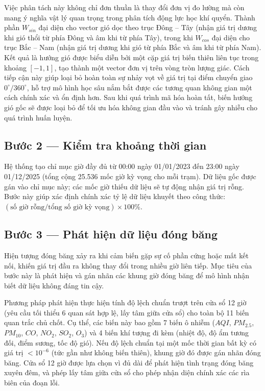 Việc phân tách này không chỉ đơn thuần là thay đổi đơn vị đo lường mà còn mang ý nghĩa vật lý quan trọng trong phân tích động lực học khí quyển. Thành phần $W_{sin}$ đại diện cho vector gió dọc theo trục Đông -- Tây (nhận giá trị dương khi gió thổi từ phía Đông và âm khi từ phía Tây), trong khi $W_{cos}$ đại diện cho trục Bắc -- Nam (nhận giá trị dương khi gió từ phía Bắc và âm khi từ phía Nam). Kết quả là hướng gió được biểu diễn bởi một cặp giá trị biến thiên liên tục trong khoảng $[-1, 1]$, tạo thành một vector đơn vị trên vòng tròn lượng giác. Cách tiếp cận này giúp loại bỏ hoàn toàn sự nhảy vọt về giá trị tại điểm chuyển giao $0^\circ/360^\circ$, hỗ trợ mô hình học sâu nắm bắt được các tương quan không gian một cách chính xác và ổn định hơn. Sau khi quá trình mã hóa hoàn tất, biến hướng gió gốc sẽ được loại bỏ để tối ưu hóa không gian đầu vào và tránh gây nhiễu cho quá trình huấn luyện.\subsection{Bước 2 --- Kiểm tra khoảng thời gian}

Hệ thống tạo chỉ mục giờ đầy đủ từ 00:00 ngày 01/01/2023 đến 23:00 ngày 01/12/2025 (tổng cộng 25.536 mốc giờ kỳ vọng cho mỗi trạm). Dữ liệu gốc được gán vào chỉ mục này; các mốc giờ thiếu dữ liệu sẽ tự động nhận giá trị rỗng. Bước này giúp xác định chính xác tỷ lệ dữ liệu khuyết theo công thức: $(\text{số giờ rỗng} / \text{tổng số giờ kỳ vọng}) \times 100\%$.

\subsection{Bước 3 --- Phát hiện dữ liệu đóng băng}

Hiện tượng đóng băng xảy ra khi cảm biến gặp sự cố phần cứng hoặc mất kết nối, khiến giá trị đầu ra không thay đổi trong nhiều giờ liên tiếp. Mục tiêu của bước này là phát hiện và gán nhãn các khung giờ đóng băng để mô hình nhận biết dữ liệu không đáng tin cậy.

Phương pháp phát hiện thực hiện tính độ lệch chuẩn trượt trên cửa sổ 12 giờ (yêu cầu tối thiểu 6 quan sát hợp lệ, lấy tâm giữa cửa sổ) cho toàn bộ 11 biến quan trắc chủ chốt. Cụ thể, các biến này bao gồm 7 biến ô nhiễm ($AQI$, $PM_{2.5}$, $PM_{10}$, $CO$, $NO_2$, $SO_2$, $O_3$) và 4 biến khí tượng đi kèm (nhiệt độ, độ ẩm tương đối, điểm sương, tốc độ gió). Nếu độ lệch chuẩn tại một mốc thời gian bất kỳ có giá trị $< 10^{-6}$ (tức gần như không biến thiên), khung giờ đó được gán nhãn đóng băng. Cửa sổ 12 giờ được lựa chọn vì đủ dài để phát hiện tình trạng đóng băng xuyên đêm, và phép lấy tâm giữa cửa sổ cho phép nhận diện chính xác các rìa biên của đoạn lỗi.


